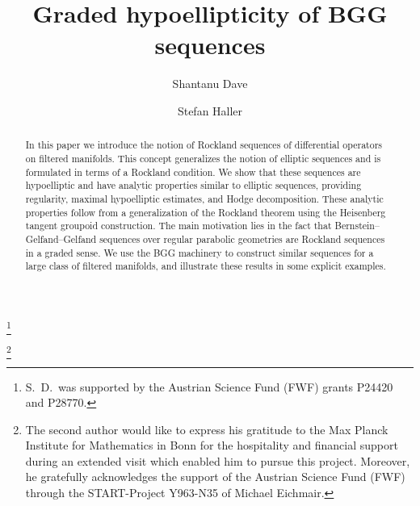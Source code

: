 \documentclass[reqno,12pt]{amsart}
\theoremstyle{plain}
\theoremstyle{definition}
\begin{document}
\title[]{Graded hypoellipticity of BGG sequences}

\author{Shantanu Dave}

\thanks{S.~D.\ was supported by the Austrian Science Fund (FWF) grants P24420 and P28770.}

\address{Shantanu Dave,
         Wolfgang Pauli Institute
         c/o Faculty of Mathematics,
         University of Vienna,
         Oskar-Morgenstern-Platz 1,
         1090 Vienna,
         Austria.}


\author{Stefan Haller}

\address{Stefan Haller, 
         Department of Mathematics,
         University of Vienna,
         Oskar-Morgenstern-Platz 1,
         1090 Vienna,
         Austria.}


\thanks{The second author would like to express his gratitude to the Max Planck Institute for Mathematics in Bonn for the hospitality and financial support during an extended visit which enabled him to pursue this project.
Moreover, he gratefully acknowledges the support of the Austrian Science Fund (FWF) through the START-Project Y963-N35 of Michael Eichmair.}

\begin{abstract}
In this paper we introduce the notion of Rockland sequences of differential operators on filtered manifolds.
This concept generalizes the notion of elliptic sequences and is formulated in terms of a Rockland condition.
We show that these sequences are hypoelliptic and have analytic properties similar to elliptic sequences, providing regularity, maximal hypoelliptic estimates, and Hodge decomposition.
These analytic properties follow from a generalization of the Rockland theorem using the Heisenberg tangent groupoid construction.
The main motivation lies in the fact that Bernstein--Gelfand--Gelfand sequences over regular parabolic geometries are Rockland sequences in a graded sense.
We use the BGG machinery to construct similar sequences for a large class of filtered manifolds, and illustrate these results in some explicit examples.
\end{abstract}

\end{document}

